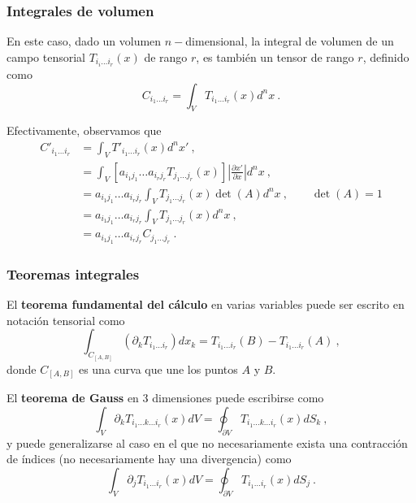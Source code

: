 \subsubsection*{Integrales de volumen}

En este caso, dado un volumen $n-$dimensional, la integral de volumen de un campo tensorial $T_{i_i \dots i_r}(x)$ de rango $r$, es también un tensor de rango $r$, definido como
\begin{equation}
    C_{i_1 \dots i_r} = \int_V T_{i_1 \dots i_r}(x) d^n x \ .
\end{equation}

Efectivamente, observamos que
\begin{align}
    C'_{i_1 \dots i_r} & = \int_V T'_{i_1 \dots i_r}(x) d^n x' \ , \\
    & = \int_V [a_{i_1 j_1} \dots a_{i_r j_r} T_{j_1 \dots j_r}(x)] \left| \frac{\partial x'}{\partial x} \right| d^n x \ , \\
    & = a_{i_1 j_1} \dots a_{i_r j_r} \int_V T_{j_1 \dots j_r}(x) \det(A) d^n x \ , \qquad \det(A) = 1 \\
    & = a_{i_1 j_1} \dots a_{i_r j_r} \int_V T_{j_1 \dots j_r}(x) d^n x \ , \\
    & = a_{i_1 j_1} \dots a_{i_r j_r} C_{j_1 \dots j_r} \ .
\end{align}

\subsubsection*{Teoremas integrales}

El \textbf{teorema fundamental del cálculo} en varias variables puede ser escrito en notación tensorial como
\begin{equation}
    \int_{C_{[A,B]}} (\partial_k T_{i_1 \dots i_r}) dx_k = T_{i_1 \dots i_r}(B) - T_{i_1 \dots i_r}(A) \ ,
\end{equation}
donde $C_{[A,B]}$ es una curva que une los puntos $A$ y $B$.

El \textbf{teorema de Gauss} en 3 dimensiones puede escribirse como
\begin{equation}
    \int_V \partial_k T_{i_1 \dots k \dots i_r}(x) dV = \oint_{\partial V} T_{i_1 \dots k \dots i_r} (x) dS_k \ ,
\end{equation}
y puede generalizarse al caso en el que no necesariamente exista una contracción de índices (no necesariamente hay una divergencia) como
\begin{equation}
    \int_V \partial_j T_{i_1 \dots i_r}(x) dV = \oint_{\partial V} T_{i_1 \dots i_r} (x) dS_j \ .
\end{equation}

